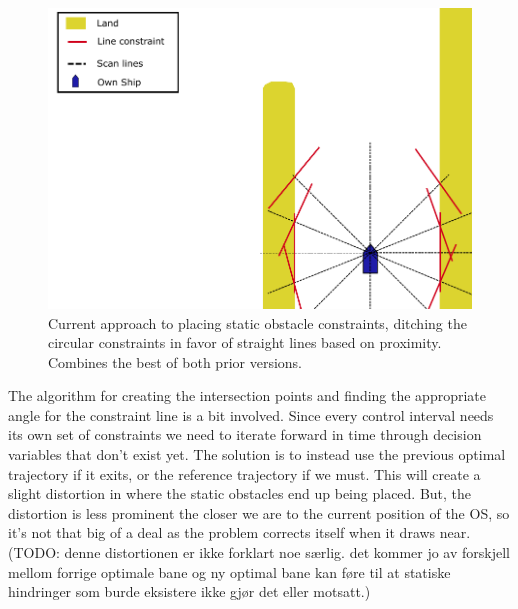 
\begin{figure}[hb!]
    \centering
    \includegraphics[width=\textwidth]{Images/StaticObs_lines.pdf}
    \caption{Current approach to placing static obstacle constraints, 
    ditching the circular constraints in favor of straight lines based on proximity. 
    Combines the best of both prior versions.}     \label{FIG: Static Obs Lines}
\end{figure} 


The algorithm for creating the intersection points and finding the appropriate angle for the constraint line is a bit involved.
Since every control interval needs its own set of constraints we need to iterate forward in time through decision variables
that don't exist yet. The solution is to instead use the previous optimal trajectory if it exits, or the reference trajectory if we must.
This will create a slight distortion in where the static obstacles end up being placed. But, the distortion is less prominent
the closer we are to the current position of the \gls{OS}, so it's not that big of a deal as the problem corrects itself when it draws near. (TODO: denne distortionen er ikke forklart noe særlig.
det kommer jo av forskjell mellom forrige optimale bane og ny optimal bane kan føre til at statiske hindringer som burde eksistere ikke gjør det eller motsatt.)

